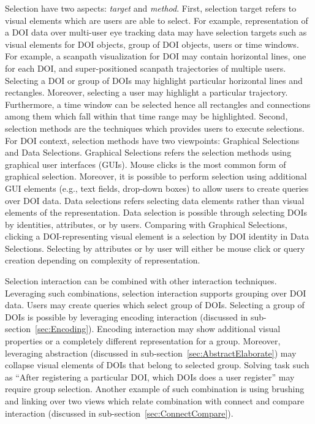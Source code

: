 Selection have two aspects: \textit{target} and \textit{method}. First, selection target refers to visual elements which are users are able to select. For example, representation of a DOI data over multi-user eye tracking data may have selection targets such as visual elements for DOI objects, group of DOI objects, users or time windows. For example, a scanpath visualization for DOI may contain horizontal lines, one for each DOI, and super-positioned scanpath trajectories of multiple users. Selecting a DOI or group of DOIs may highlight particular horizontal lines and rectangles. Moreover, selecting a user may highlight a particular trajectory. Furthermore, a time window can be selected hence all rectangles and connections among them which fall within that time range may be highlighted. Second, selection methods are the techniques which provides users to execute selections. For DOI context, selection methods have two viewpoints: Graphical Selections and Data Selections. Graphical Selections refers the selection methods using graphical user interfaces (GUIs). Mouse clicks is the most common form of graphical selection. Moreover, it is possible to perform selection using additional GUI elements (e.g., text fields, drop-down boxes) to allow users to create queries over DOI data. Data selections refers selecting data elements rather than visual elements of the representation. Data selection is possible through selecting DOIs by identities, attributes, or by users.  Comparing with Graphical Selections, clicking a DOI-representing visual element is a selection by DOI identity in Data Selections. Selecting by attributes or by user will either be mouse click or query creation depending on complexity of representation.
 
Selection interaction can be combined with other interaction techniques. Leveraging such combinations, selection interaction supports grouping over DOI data. Users may create queries which select group of DOIs. Selecting a group of DOIs is possible by leveraging encoding interaction (discussed in sub-section~\ref{sec:Encoding}). Encoding interaction may show additional visual properties or a completely different representation for a group. Moreover, leveraging abstraction (discussed in sub-section~\ref{sec:AbstractElaborate}) may collapse visual elements of DOIs that belong to selected group. Solving task such as ``After registering a particular DOI, which DOIs does a user register'' may require group selection. Another example of such combination is using brushing and linking over two views which relate combination with connect and compare interaction (discussed in sub-section~\ref{sec:ConnectCompare}). 
	
